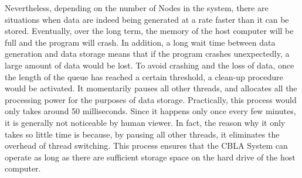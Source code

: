 Nevertheless, depending on the number of Nodes in the system, there are situations when data are indeed being generated at a rate faster than it can be stored. Eventually, over the long term, the memory of the host computer will be full and the program will crash. In addition, a long wait time between data generation and data storage means that if the program crashes unexpectedly, a large amount of data would be lost. To avoid crashing and the loss of data, once the length of the queue has reached a certain threshold, a clean-up procedure would be activated. It momentarily pauses all other threads, and allocates all the processing power for the purposes of data storage. Practically, this process would only takes around 50 milliseconds. Since it happens only once every few minutes, it is generally not noticeable by human viewer. In fact, the reason why it only takes so little time is because, by pausing all other threads, it eliminates the overhead of thread switching. This process ensures that the CBLA System can operate as long as there are sufficient storage space on the hard drive of the host computer. 

